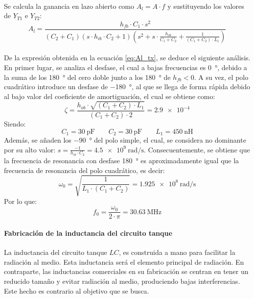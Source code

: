 \paragraph{}
Se calcula la ganancia en lazo abierto como $A_l = A \cdot f$ y sustituyendo los valores de $Y_{T1}$ e $Y_{T2}$:
\begin{equation}
   \label{eq:Al_tx}
   A_l = \frac{h_{fb} \cdot C_1 \cdot s^2}{ \left( C_2+C_1 \right) \left( s \cdot h_{ib} \cdot C_2 + 1\right) \left( s^2 + s \cdot \frac{h_{ob}}{C_1 + C_2} + \frac{1}{(C_1 + C_2)\cdot L_1}\right) }
\end{equation}
\paragraph{}
De la expresi\'on obtenida en la ecuaci\'on \ref{eq:Al_tx}, se deduce el siguiente an\'alisis. 
En primer lugar, se analiza el desfase, el cual a bajas frecuencias es \SI{0}{\degree}, debido a la suma de los \SI{180}{\degree} del cero doble junto a los \SI{180}{\degree} de $h_{fb} < 0$. A su vez, el polo cuadr\'atico introduce un desfase de \SI{-180}{\degree}, al que se llega de forma r\'apida debido al bajo valor del coeficiente de amortiguaci\'on, el cual se obtiene como:$$\zeta = \frac{h_{ob} \cdot \sqrt{(C_1+C_2) \cdot L_1}}{(C_1+C_2) \cdot 2} = \num{2.9e-4}$$
Siendo:
$$C_1 = \SI{30}{\pico\farad} \quad \quad C_2 = \SI{30}{\pico\farad} \quad \quad L_1 = \SI{450}{\nano\henry}$$
Adem\'as, se añaden los \SI{-90}{\degree} del polo simple, el cual, se considera no dominante por su alto valor: $s = \frac{-1}{h_{ib} \cdot C_2} = \SI{4.5e9}{\radian\per\second}$. 
Consecuentemente, se obtiene que la frecuencia de resonancia con desfase \SI{180}{\degree} es aproximadamente igual que la frecuencia de resonancia del polo cuadrático, es decir:
$$\omega_0 = \sqrt{\frac{1}{L_1 \cdot (C_1 + C_2)}} = \SI{1.925e8}{\radian\per\second}$$ 
Por lo que:
\begin{equation}
   f_0 = \frac{\omega_0}{2\cdot\pi} = \SI{30.63}{\mega\hertz}
\end{equation}
\paragraph{Fabricaci\'on de la inductancia del circuito tanque}
\paragraph{}
La inductancia del circuito tanque $LC$, es construida a mano para facilitar la radiación al medio. Esta inductancia será el elemento principal de radiación.
En contraparte, las inductancias comerciales en su fabricación se centran en tener un reducido tamaño y evitar radiación al medio, produciendo bajas interferencias. Este hecho es contrario al objetivo que se busca.
